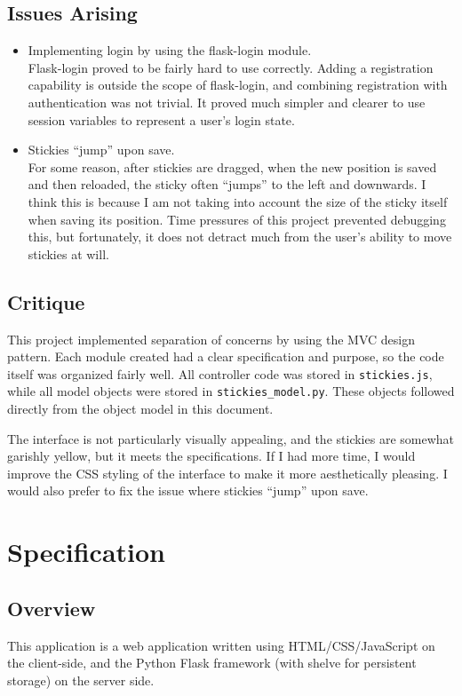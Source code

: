\documentclass[11pt,letterpaper]{article}
\begin{document}
\subsection{Issues Arising}
\begin{itemize}
\item Implementing login by using the flask-login module. \\
Flask-login proved to be fairly hard to use correctly. Adding a registration capability is outside the scope of flask-login, and combining registration with authentication was not trivial. It proved much simpler and clearer to use session variables to represent a user's login state.
\item Stickies ``jump'' upon save.\\
For some reason, after stickies are dragged, when the new position is saved and then reloaded, the sticky often ``jumps'' to the left and downwards. I think this is because I am not taking into account the size of the sticky itself when saving its position. Time pressures of this project prevented debugging this, but fortunately, it does not detract much from the user's ability to move stickies at will.
\end{itemize}

\subsection{Critique}
This project implemented separation of concerns by using the MVC design pattern. Each module created had a clear specification and purpose, so the code itself was organized fairly well. All controller code was stored in \texttt{stickies.js}, while all model objects were stored in \texttt{stickies\_model.py}. These objects followed directly from the object model in this document.

The interface is not particularly visually appealing, and the stickies are somewhat garishly yellow, but it meets the specifications. If I had more time, I would improve the CSS styling of the interface to make it more aesthetically pleasing. I would also prefer to fix the issue where stickies ``jump'' upon save.

\section{Specification}
\subsection{Overview}
This application is a web application written using HTML/CSS/JavaScript on the client-side, and the Python Flask framework (with shelve for persistent storage) on the server side.
\end{document}

